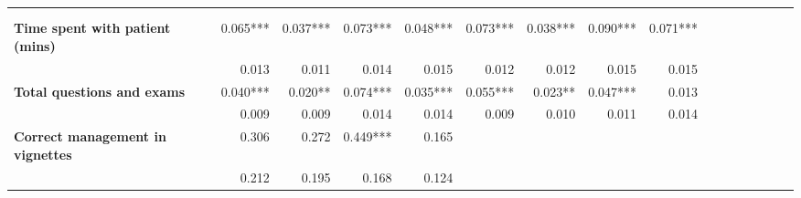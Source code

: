 \begin{tabular}{@{\extracolsep{5pt}}lrrrrrrrrrrrrrrr}
\toprule
&  &  &  &  &  &  &  &  \\
{\bf } &  &  &  &  &  &  &  &  \\
\hline
{\bf Time spent with patient (mins)} & 0.065*** & 0.037*** & 0.073*** & 0.048*** & 0.073*** & 0.038*** & 0.090*** & 0.071*** \\
{\bf } & 0.013\phantom{***} & 0.011\phantom{***} & 0.014\phantom{***} & 0.015\phantom{***} & 0.012\phantom{***} & 0.012\phantom{***} & 0.015\phantom{***} & 0.015\phantom{***} \\
{\bf Total questions and exams} & 0.040*** & 0.020**\phantom{*} & 0.074*** & 0.035*** & 0.055*** & 0.023**\phantom{*} & 0.047*** & 0.013\phantom{***} \\
{\bf } & 0.009\phantom{***} & 0.009\phantom{***} & 0.014\phantom{***} & 0.014\phantom{***} & 0.009\phantom{***} & 0.010\phantom{***} & 0.011\phantom{***} & 0.014\phantom{***} \\
{\bf Correct management in vignettes} & 0.306\phantom{***} & 0.272\phantom{***} & 0.449*** & 0.165\phantom{***} & \phantom{***} & \phantom{***} & \phantom{***} & \phantom{***} \\
{\bf } & 0.212\phantom{***} & 0.195\phantom{***} & 0.168\phantom{***} & 0.124\phantom{***} & \phantom{***} & \phantom{***} & \phantom{***} & \phantom{***} \\

\end{tabular}
